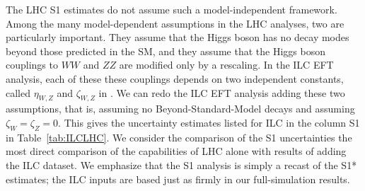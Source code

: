 The LHC S1 estimates do not assume such a model-independent framework.
Among the many model-dependent assumptions in the LHC  analyses, two are
particularly important. They  assume  that the Higgs boson has no decay
modes beyond those predicted in the SM, and they  assume that the Higgs
boson couplings to $WW$ and $ZZ$ are modified only by a rescaling.  In
the ILC EFT analysis, each of these these couplings depends on two
independent constants, called $\eta_{W,Z}$ and $\zeta_{W,Z}$ in
\cite{Barklow:2017suo}.   We can redo the ILC EFT analysis
adding these two assumptions, that is, assuming no
Beyond-Standard-Model decays and assuming $\zeta_{W} = \zeta_Z = 0$.
This gives the uncertainty estimates listed for ILC  in the column S1
in Table~\ref{tab:ILCLHC}.   We consider the comparison of the S1
uncertainties the most direct comparison of the capabilities of  LHC
alone with results of adding the ILC dataset. 
  We emphasize that the S1 analysis is 
simply a recast of the S1* estimates; the ILC inputs are based just 
as firmly in our full-simulation results.

